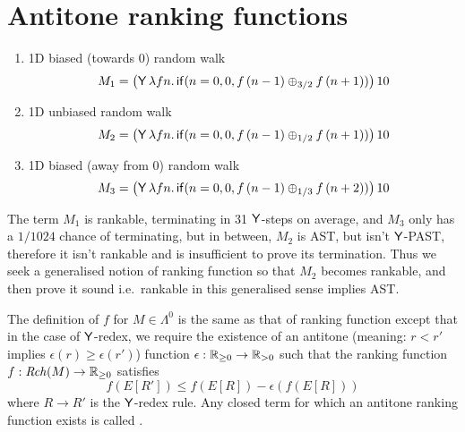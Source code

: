 \section{Antitone ranking functions}
\label{sec:antitone}

\begin{example}
\label{ex:ac-ranking}
\begin{enumerate}
\item 1D biased (towards 0) random walk
\[
M_1 = 
\big(\mathsf{Y} \, \lambda f n . \, 
\mathsf{if}(n = 0, 0, f \, (n - 1) \oplus_{3/2} f \, (n + 1))\big) \, 10
\]

\item 1D unbiased random walk
\[
M_2 = 
\big(\mathsf{Y} \, \lambda f n . \, 
\mathsf{if}(n = 0, 0, f \, (n - 1) \oplus_{1/2} f \, (n + 1))\big) \, 10
\]

\item 1D biased (away from 0) random walk
\[
M_3 = 
\big(\mathsf{Y} \, \lambda f n . \, 
\mathsf{if}(n = 0, 0, f \, (n - 1) \oplus_{1/3} f \, (n + 2))\big) \, 10
\]



\end{enumerate}
\end{example}

The term $M_1$ is rankable, terminating in 31 $\tY$-steps on average, and $M_3$ only has a $1/1024$ chance of terminating, but in between, $M_2$ is AST, but isn't $\tY$-PAST, therefore it isn't rankable and  is insufficient to prove its termination. 
Thus we seek a generalised notion of ranking function so that $M_2$ becomes rankable, and then prove it sound i.e.~rankable in this generalised sense implies AST.


\begin{definition}
The definition of  $f$ for $M \in \Lambda^0$ is the same as that of ranking function except that in the case of $\tY$-redex, 
we require the existence of an antitone (meaning: $r < r'$ implies $\epsilon(r) \geq \epsilon(r')$) function $\epsilon : \nnReal \to \pReal$ such that the ranking function $f :\mathit{Rch}(M) \to \mathbb{R}_{{\geq}0}$ satisfies
\[f(E[R']) \leq f(E[R]) - \epsilon(f(E[R])) \] 
where $R \to R'$ is the $\tY$-redex rule.
Any closed term for which an antitone ranking function exists is called .
\iffalse
Given a ranking function $f$ on $M \in \Lambda^0$, we say that $f$ is \emph{antitone} if there exists an antitone function\footnote{i.e.~$r < r'$ implies $\epsilon(r) \geq \epsilon(r')$} $\epsilon : \nnReal \to \pReal$ such that %
\[
f(E[R']) \leq f(E[R]) - \epsilon(f(E[R])) 
\]
for all $E[R'] \in \mathit{Rch}(M)$ where $R \to R'$ is the $\tY$-redex rule.
\fi
\end{definition}

